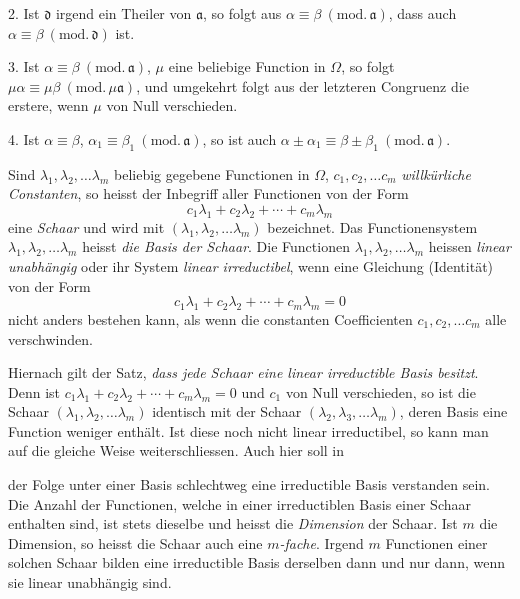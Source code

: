 \documentclass{article}
\begin{document}
2. Ist $\mathfrak{d}$ irgend ein Theiler von $\mathfrak{a}$, so folgt aus $\alpha \equiv \beta \ (\text{mod.}\,\mathfrak{a})$, dass auch $\alpha \equiv \beta \ (\text{mod.}\,\mathfrak{d})$ ist.

3. Ist $\alpha \equiv \beta \ (\text{mod.}\,\mathfrak{a})$, $\mu$ eine beliebige Function in $\Omega$, so folgt $\mu\alpha \equiv \mu\beta \ (\text{mod.}\,\mu\mathfrak{a})$, und umgekehrt folgt aus der letzteren Congruenz die erstere, wenn $\mu$ von Null verschieden.

4. Ist $\alpha \equiv \beta$, $\alpha_{1} \equiv \beta_{1} \ (\text{mod.}\,\mathfrak{a})$, so ist auch $\alpha \pm \alpha_{1} \equiv \beta \pm \beta_{1} \ (\text{mod.}\,\mathfrak{a})$.

Sind $\lambda_{1}, \lambda_{2}, \ldots \lambda_{m}$ beliebig gegebene Functionen in $\Omega$, $c_{1}, c_{2}, \ldots c_{m}$ \emph{willkürliche Constanten}, so heisst der Inbegriff aller Functionen von der Form
\[ c_{1}\lambda_{1} + c_{2}\lambda_{2} + \cdots + c_{m}\lambda_{m} \]
eine \emph{Schaar} und wird mit $(\lambda_{1}, \lambda_{2}, \ldots \lambda_{m})$ bezeichnet. Das Functionensystem $\lambda_{1}, \lambda_{2}, \ldots \lambda_{m}$ heisst \emph{die Basis der Schaar}. Die Functionen $\lambda_{1}, \lambda_{2}, \ldots \lambda_{m}$ heissen \emph{linear unabhängig} oder ihr System \emph{linear irreductibel}, wenn eine Gleichung (Identität) von der Form
\[ c_{1}\lambda_{1} + c_{2}\lambda_{2} + \cdots + c_{m}\lambda_{m} = 0 \]
nicht anders bestehen kann, als wenn die constanten Coefficienten $c_{1}, c_{2}, \ldots c_{m}$ alle verschwinden.

Hiernach gilt der Satz, \emph{dass jede Schaar eine linear irreductible Basis besitzt}. Denn ist $c_{1}\lambda_{1} + c_{2}\lambda_{2} + \cdots + c_{m}\lambda_{m} = 0$ und $c_{1}$ von Null verschieden, so ist die Schaar $(\lambda_{1}, \lambda_{2}, \ldots \lambda_{m})$ identisch mit der Schaar $(\lambda_{2}, \lambda_{3}, \ldots \lambda_{m})$, deren Basis eine Function weniger enthält. Ist diese noch nicht linear irreductibel, so kann man auf die gleiche Weise weiterschliessen. Auch hier soll in

der Folge unter einer Basis schlechtweg eine irreductible Basis verstanden sein. Die Anzahl der Functionen, welche in einer irreductiblen Basis einer Schaar enthalten sind, ist stets dieselbe und heisst die \emph{Dimension} der Schaar. Ist $m$ die Dimension, so heisst die Schaar auch eine \emph{$m$-fache}. Irgend $m$ Functionen einer solchen Schaar bilden eine irreductible Basis derselben dann und nur dann, wenn sie linear unabhängig sind.
\end{document}
